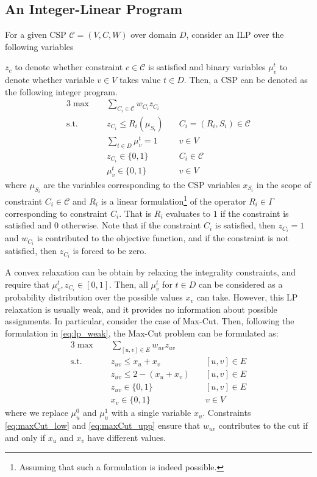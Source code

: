 \iffalse
\subsection{An Integer-Linear Program}
For a given CSP $\mathcal{C} = (V,C,W)$ over domain $D$, consider an ILP over the following variables

 $z_c$ to denote whether constraint $c \in \mathcal{C}$ is satisfied and binary variables $\mu_v^t$ to denote whether variable $v \in V$ takes value $t \in D$. 
Then, a CSP can be denoted as the following integer program.
\begin{alignat}{3}
	\max \quad & \sum_{C_i \in \mathcal{C}}w_{C_i} z_{C_i} & \label{eq:lp_weak}\\
	\text{s.t.} \quad & z_{C_i} \le R_{i}( \mu_{S_i} ) & \quad C_i = (R_i, S_i) \in \mathcal{C} \nonumber \\
	& \sum_{t \in D} \mu_v^t = 1 & \quad v \in V \nonumber\\
	& z_{C_i} \in \{0,1\} & \quad {C_i} \in \mathcal{C} \nonumber\\
	&	\mu_v^t \in \{0,1\}	& \quad v \in  V \nonumber
\end{alignat}
where $\mu_{S_i}$ are the variables corresponding to the CSP variables $x_{S_i}$ in the scope of constraint ${C_i} \in \mathcal{C}$ and $R_i$ is a linear formulation\footnote{Assuming that such a formulation is indeed possible.} of the operator $R_i \in \Gamma$ corresponding to constraint $C_i$. 
That is $R_i$ evaluates to $1$ if the constraint is satisfied and $0$ otherwise. 
Note that if the constraint ${C_i}$ is satisfied, then $z_{C_i} = 1$ and $w_{C_i}$ is contributed to the objective function, and if the constraint is not satisfied, then $z_{C_i}$ is forced to be zero. 

A convex relaxation can be obtain by relaxing the integrality constraints, and require that $\mu_v^t, z_{C_i} \in [ 0,1]$. 
Then, all $\mu_v^t$ for $t \in D$ can be considered as a probability distribution over the possible values $x_v$ can take.
However, this LP relaxation is usually weak, and it provides no information about possible assignments. In particular, consider the case of Max-Cut. 
Then, following the formulation in \eqref{eq:lp_weak}, the Max-Cut problem can be formulated as:
\begin{alignat}{3}
\max \quad & \sum_{[u,v]\in E}w_{uv} z_{uv} & \label{eq:maxCut_weak}\\
\text{s.t.} \quad & z_{uv} \le x_u + x_v & \quad [u,v] \in E \label{eq:maxCut_low} \\
& z_{uv} \le 2 - ( x_u + x_v ) & \quad [u,v] \in E \label{eq:maxCut_upp}\\
& z_{uv} \in \{0,1\} & \quad [u,v] \in E \nonumber\\
&	x_v \in \{0,1\}	& \quad v \in  V \nonumber
\end{alignat}
where we replace $\mu_{u}^0$ and $\mu_u^1$ with a single variable $x_u$. 
Constraints \eqref{eq:maxCut_low} and \eqref{eq:maxCut_upp} ensure that $w_{uv}$ contributes to the cut if and only if $x_u$ and $x_v$ have different values.

